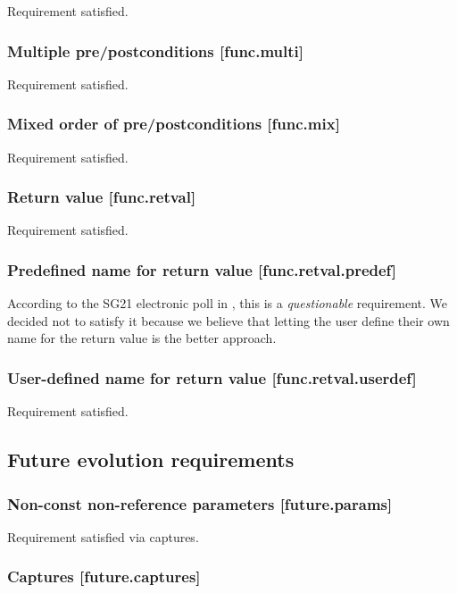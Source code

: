 Requirement satisfied.

\subsubsection{Multiple pre/postconditions  [func.multi]}

Requirement satisfied.

\subsubsection{Mixed order of pre/postconditions  [func.mix]}

Requirement satisfied.

\subsubsection{Return value  [func.retval]}

Requirement satisfied.

\subsubsection{Predefined name for return value  [func.retval.predef]}

According to the SG21 electronic poll in \cite{P2885R2}, this is a \emph{questionable} requirement. We decided not to satisfy it because we believe that letting the user define their own name for the return value is the better approach.

\subsubsection{User-defined name for return value  [func.retval.userdef]}

Requirement satisfied.

\subsection{Future evolution requirements}

\subsubsection{Non-const non-reference parameters  [future.params]}

Requirement satisfied via captures.

\subsubsection{Captures  [future.captures]}

